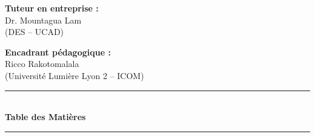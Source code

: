 \documentclass[12pt]{extarticle}
\begin{document}
\vspace{1.5cm}

\begin{tcolorbox}[colframe=myblue, colback=white, boxrule=0.8pt, arc=4pt, width=0.9\textwidth, left=0.5cm, right=0.5cm]
    \begin{minipage}{0.45\textwidth}
        \raggedright
        \textbf{Tuteur en entreprise :}\\
        Dr. Mountagua Lam\\
        (DES – UCAD)
    \end{minipage}
    \hfill
    \begin{minipage}{0.45\textwidth}
        \raggedleft
        \textbf{Encadrant pédagogique :}\\
        Ricco Rakotomalala\\
        (Université Lumière Lyon 2 – ICOM)
    \end{minipage}
\end{tcolorbox}

\vfill

\newpage

\begin{center}
    \color{myblue}\rule{0.6\textwidth}{3pt}\\[1em]
    {\fontsize{18}{22}\selectfont\bfseries Table des Matières}\\[1em]
    \color{myblue}\rule{0.6\textwidth}{1pt}
\end{center}

\renewcommand{\contentsname}{Table des Matières} 
\tableofcontents 

\vspace{1cm}
 
\newpage
\end{document}
